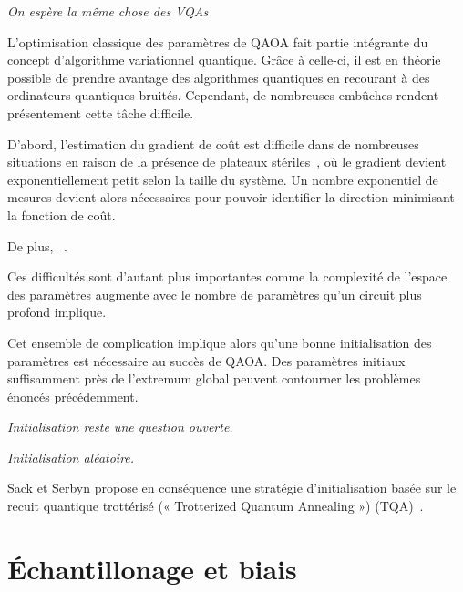 \textcolor{mydarkred}{\textit{On espère la même chose des VQAs}}

L'optimisation classique des paramètres de QAOA fait partie intégrante du concept d'algorithme variationnel quantique. Grâce à celle-ci, il est en théorie possible de prendre avantage des algorithmes quantiques en recourant à des ordinateurs quantiques bruités. Cependant, de nombreuses embûches rendent présentement cette tâche difficile. 

D'abord, l'estimation du gradient de coût est difficile dans de nombreuses situations en raison de la présence de plateaux stériles~\cite{mccleanBarrenPlateausQuantum2018, laroccaReviewBarrenPlateaus2024}, où le gradient devient exponentiellement petit selon la taille du système. Un nombre exponentiel de mesures devient alors nécessaires pour pouvoir identifier la direction minimisant la fonction de coût.

De plus, ~\cite{bittelTrainingVariationalQuantum2021}. 

Ces difficultés sont d'autant plus importantes comme la complexité de l'espace des paramètres augmente avec le nombre de paramètres qu'un circuit plus profond implique. 

Cet ensemble de complication implique alors qu'une bonne initialisation des paramètres est nécessaire au succès de QAOA.  Des paramètres initiaux suffisamment près de l'extremum global peuvent contourner les problèmes énoncés précédemment.

\textcolor{mydarkred}{\textit{Initialisation reste une question ouverte.}}

\textcolor{mydarkred}{\textit{Initialisation aléatoire.}}

Sack et Serbyn propose en conséquence une stratégie d'initialisation basée sur le recuit quantique trottérisé (« Trotterized Quantum Annealing ») (TQA)~\cite{sackQuantumAnnealingInitialization2021}.  


\section{Échantillonage et biais}
\label{sec:echantillonage-et-biais}

